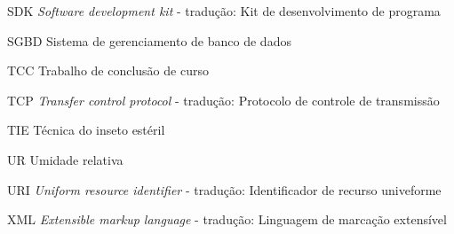 \begin{siglas}
	\item[SDK]		\textit{Software development kit} - tradução: Kit de desenvolvimento de programa
	\item[SGBD]		Sistema de gerenciamento de banco de dados
	\item[TCC]      Trabalho de conclusão de curso
    \item[TCP]		\textit{Transfer control protocol} - tradução: Protocolo de controle de transmissão 
	\item[TIE]		Técnica do inseto estéril
	\item[UR]	    Umidade relativa
	\item[URI]	    \textit{Uniform resource identifier} - tradução: Identificador de recurso univeforme
	\item[XML]      \textit{Extensible markup language} - tradução: Linguagem de marcação extensível
    
\end{siglas}

\tableofcontents*
\cleardoublepage
